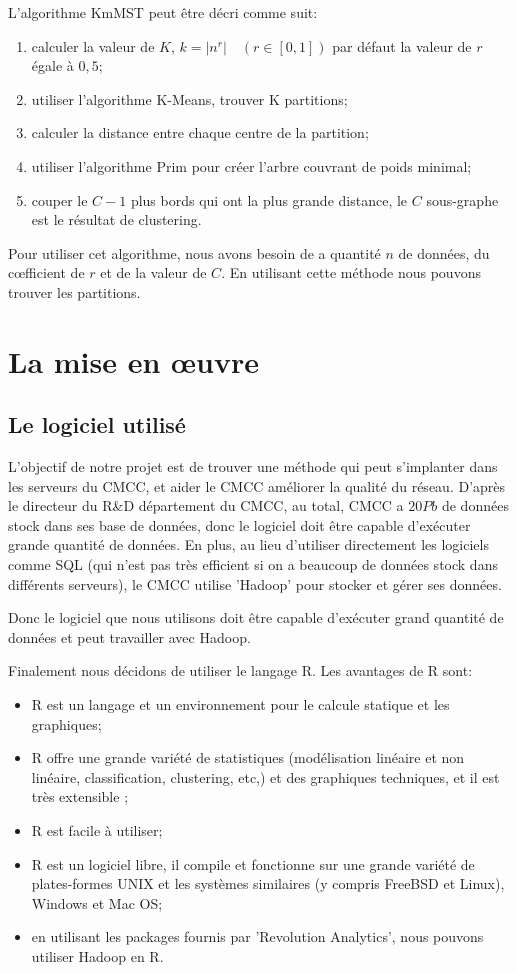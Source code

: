 L'algorithme KmMST peut être décri comme suit:


\begin{enumerate}
\item calculer la valeur de $K$, $k=\left\vert n^r \right\vert \quad  \left( r \in \left[ 0,1 \right]  \right) $ par défaut la valeur de $r$ égale à $0,5$;
\item utiliser l'algorithme K-Means, trouver K partitions;
\item calculer la distance entre chaque centre de la partition;
\item utiliser l'algorithme Prim pour créer l'arbre couvrant de poids minimal;
\item couper le $C-1$ plus bords qui ont la plus grande distance, le $C$ sous-graphe est le résultat de clustering.
\end{enumerate}


Pour utiliser cet algorithme, nous avons besoin de a quantité $n$ de données, du c\oe fficient de $r$ et de la valeur de $C$. En utilisant cette méthode nous pouvons trouver les partitions.

\section{La mise en \oe uvre}
\subsection{Le logiciel utilisé}
L'objectif de notre projet est de trouver une méthode qui peut s'implanter dans les serveurs du CMCC, et aider le CMCC améliorer la qualité du réseau. D'après le directeur du R\&D département du CMCC, au total, CMCC a $20Pb$ de données stock dans ses base de données, donc le logiciel doit être capable d'exécuter grande quantité de données. En plus,  au lieu d'utiliser directement les logiciels comme SQL (qui n'est pas très efficient si on a beaucoup de données stock dans différents serveurs), le CMCC utilise 'Hadoop' pour stocker et gérer ses données.

Donc le logiciel que nous utilisons doit être capable d'exécuter grand quantité de données et peut travailler avec Hadoop. 

Finalement nous décidons de utiliser le langage \textsf{R}. Les avantages de R sont:

\begin{itemize}
\item R est un langage et un environnement pour le calcule statique et les graphiques; 
\item R offre une grande variété de statistiques (modélisation linéaire et non linéaire, classification, clustering, etc,) et des graphiques techniques, et il est très extensible ;
\item R est facile à utiliser; 
\item R est un logiciel libre, il compile et fonctionne sur une grande variété de plates-formes UNIX et les systèmes similaires (y compris FreeBSD et Linux), Windows et Mac OS;
\item en utilisant les packages fournis par 'Revolution Analytics', nous pouvons utiliser Hadoop en R.
\end{itemize}

